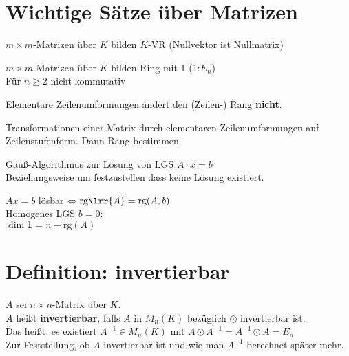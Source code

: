 \section{Wichtige Sätze über Matrizen}
		\item $m\times m$-Matrizen über $K$ bilden $K$-VR (Nullvektor ist Nullmatrix)
		\item $m\times m$-Matrizen über $K$ bilden Ring mit $1$ (1:$E_n$)\\
			Für $n\geq 2$ nicht kommutativ
		\item Elementare Zeilenumformungen ändert den (Zeilen-) Rang \textbf{nicht}.
		\item Transformationen einer Matrix durch elementaren Zeilenumformungen auf \\
			Zeilenstufenform. Dann Rang bestimmen.
		\item Gauß-Algorithmus zur Lösung von LGS $A\cdot x=b$\\
			Beziehungsweise um festzustellen dass keine Lösung existiert.
		\item $Ax=b$ lösbar $\Leftrightarrow \mbox{rg}\lrr{A}=\mbox{rg}(A,b)$\\
			Homogenes LGS $b=0$:\\
			$\dim\mathbb{L}=n-\mbox{rg}(A)$
	\subExEnd

\section{Definition: invertierbar}
	$A$ sei $n\times n$-Matrix über $K$.\\
	$A$ heißt \textbf{invertierbar}, falls $A$ in $M_n(K)$ bezüglich $\odot$ invertierbar ist.\\
	Das heißt, es existiert $A^{-1}\in M_n(K)$ mit $A\odot A^{-1}=A^{-1}\odot A=E_n$\\
	Zur Feststellung, ob $A$ invertierbar ist und wie man $A^{-1}$ berechnet später mehr.
